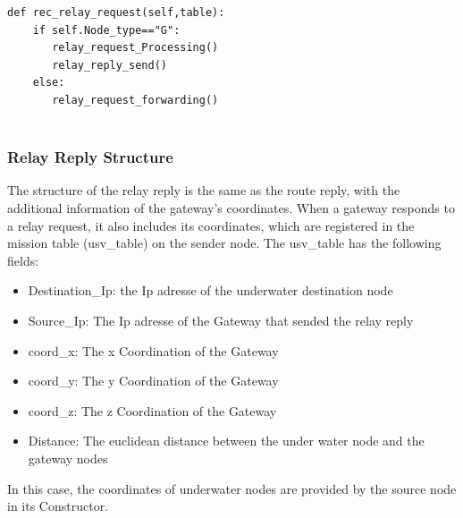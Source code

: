 \documentclass[]{nsm-thesis}
\begin{document}
\begin{lstlisting}[caption={Relay Request Handling}, label={lst:example}]
def rec_relay_request(self,table):
    if self.Node_type=="G":
       relay_request_Processing()
       relay_reply_send()
    else:
       relay_request_forwarding()
       
\end{lstlisting}
\subsubsection{Relay Reply Structure}
The structure of the relay reply is the same as the route reply, with the additional information of the gateway's coordinates. When a gateway responds to a relay request, it also includes its coordinates, which are registered in the mission table (usv\_table) on the sender node. The usv\_table has the following fields:
\begin{itemize}
    \item Destination\_Ip: the Ip adresse of the underwater destination node
    \item Source\_Ip: The Ip adresse of the Gateway that sended the relay reply
    \item coord\_x: The x Coordination of the Gateway
    \item coord\_y: The y Coordination of the Gateway
    \item coord\_z: The z Coordination of the Gateway
    \item Distance: The euclidean distance between the under water node and the gateway nodes
\end{itemize}  
In this case, the coordinates of underwater nodes are provided by the source node in its Constructor.
\end{document}
